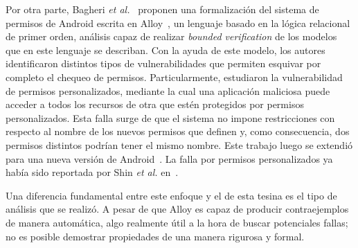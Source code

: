 Por otra parte, Bagheri \textit{et al.}~\cite{bagheri15} proponen una
formalización del sistema de permisos de Android escrita en Alloy~\cite{alloy},
un lenguaje basado en la lógica relacional de primer orden,
%
%
análisis capaz de realizar \textit{bounded verification} de los modelos que en
este lenguaje se describan. Con la ayuda de este modelo, los autores
identificaron distintos tipos de vulnerabilidades que permiten esquivar por
completo el chequeo de permisos. Particularmente, estudiaron la vulnerabilidad
de permisos personalizados, mediante la cual una aplicación maliciosa puede
acceder a todos los recursos de otra que estén protegidos por permisos
personalizados. Esta falla surge de que el sistema no impone restricciones con
respecto al nombre de los nuevos permisos que definen y, como consecuencia, dos
permisos distintos podrían tener el mismo nombre. Este trabajo luego se extendió
para una nueva versión de Android~\cite{bagheri}. La falla por permisos
personalizados ya había sido reportada por Shin \textit{et al.}
en~\cite{shin-custom}.

Una diferencia fundamental entre este enfoque y el de esta tesina es el tipo de
análisis que se realizó. A pesar de que Alloy es capaz de producir
contraejemplos de manera automática, algo realmente útil a la hora de buscar
potenciales fallas; no es posible demostrar propiedades de una manera rigurosa y
formal.



